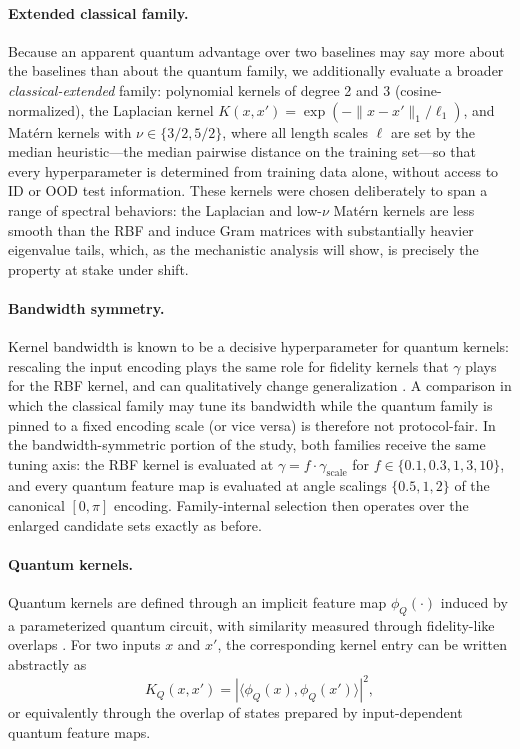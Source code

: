 \documentclass[journal]{IEEEtran}
\begin{document}
\paragraph{Extended classical family.}
Because an apparent quantum advantage over two baselines may say more about the baselines than about the quantum family, we additionally evaluate a broader \emph{classical-extended} family: polynomial kernels of degree 2 and 3 (cosine-normalized), the Laplacian kernel $K(x,x')=\exp(-\|x-x'\|_1/\ell_1)$, and Mat\'ern kernels with $\nu \in \{3/2, 5/2\}$, where all length scales $\ell$ are set by the median heuristic---the median pairwise distance on the training set---so that every hyperparameter is determined from training data alone, without access to ID or OOD test information. These kernels were chosen deliberately to span a range of spectral behaviors: the Laplacian and low-$\nu$ Mat\'ern kernels are less smooth than the RBF and induce Gram matrices with substantially heavier eigenvalue tails, which, as the mechanistic analysis will show, is precisely the property at stake under shift.

\paragraph{Bandwidth symmetry.}
Kernel bandwidth is known to be a decisive hyperparameter for quantum kernels: rescaling the input encoding plays the same role for fidelity kernels that $\gamma$ plays for the RBF kernel, and can qualitatively change generalization \cite{shaydulin2022bandwidth,canatar2023bandwidth}. A comparison in which the classical family may tune its bandwidth while the quantum family is pinned to a fixed encoding scale (or vice versa) is therefore not protocol-fair. In the bandwidth-symmetric portion of the study, both families receive the same tuning axis: the RBF kernel is evaluated at $\gamma = f \cdot \gamma_{\mathrm{scale}}$ for $f \in \{0.1, 0.3, 1, 3, 10\}$, and every quantum feature map is evaluated at angle scalings $\{0.5, 1, 2\}$ of the canonical $[0,\pi]$ encoding. Family-internal selection then operates over the enlarged candidate sets exactly as before.

\paragraph{Quantum kernels.}
Quantum kernels are defined through an implicit feature map $\phi_Q(\cdot)$ induced by a parameterized quantum circuit, with similarity measured through fidelity-like overlaps \cite{havlicek2019quantumenhanced,schuld2019featurehilbert,schuld2021kernelmethods}. For two inputs $x$ and $x'$, the corresponding kernel entry can be written abstractly as
\[
K_Q(x,x') = |\langle \phi_Q(x), \phi_Q(x') \rangle|^2,
\]
or equivalently through the overlap of states prepared by input-dependent quantum feature maps.
\end{document}
